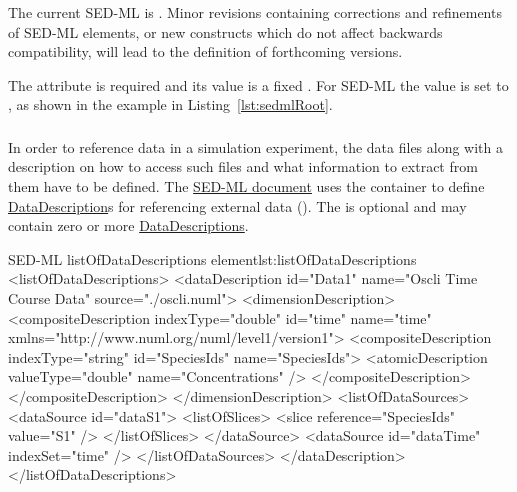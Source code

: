 \subsubsection{}
\label{sec:version}
The current SED-ML  is \code{\version}. Minor revisions containing corrections and refinements of SED-ML elements, or new constructs which do not affect backwards compatibility, will lead to the definition of forthcoming versions.

The  attribute is required and its value is a fixed . For SED-ML \currentLV the value is set to \code{\version}, as shown in the example in Listing~\ref{lst:sedmlRoot}.

\subsubsection{}
\label{class:listOfDataDescriptions}
In order to reference data in a simulation experiment, the data files along with a description on how to access such files and what information to extract from them have to be defined. The \hyperref[class:sed-ml]{SED-ML document} uses the  container to define \hyperref[class:dataDescription]{DataDescription}s for referencing external data (). The  is optional and may contain zero or more \hyperref[class:dataDescription]{DataDescriptions}.


\begin{myXmlLst}{SED-ML listOfDataDescriptions element}{lst:listOfDataDescriptions}
<listOfDataDescriptions>
	<dataDescription id="Data1" name="Oscli Time Course Data" source="./oscli.numl">
		<dimensionDescription>
			<compositeDescription indexType="double" id="time" name="time" xmlns="http://www.numl.org/numl/level1/version1">
        			<compositeDescription indexType="string" id="SpeciesIds" name="SpeciesIds">
         			<atomicDescription valueType="double" name="Concentrations" />
          		</compositeDescription>
      		</compositeDescription>
		</dimensionDescription>
		<listOfDataSources>
			<dataSource id="dataS1">
				<listOfSlices>
					<slice reference="SpeciesIds" value="S1" />
				</listOfSlices>
			</dataSource>
			<dataSource id="dataTime" indexSet="time" />
		</listOfDataSources>
	</dataDescription>
</listOfDataDescriptions>
\end{myXmlLst}


